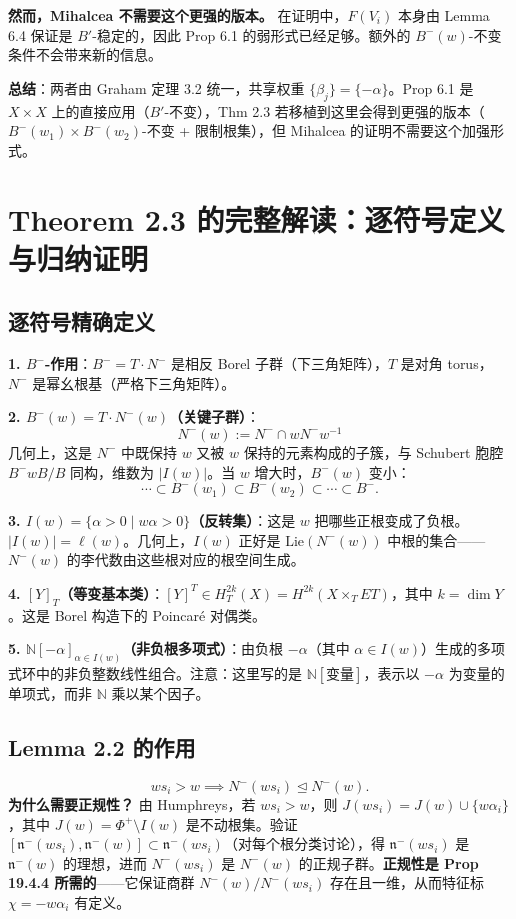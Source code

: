 \textbf{然而，Mihalcea 不需要这个更强的版本。} 在证明中，$F(V_i)$ 本身由 Lemma 6.4 保证是 $B'$-稳定的，因此 Prop 6.1 的弱形式已经足够。额外的 $B^-(w)$-不变条件不会带来新的信息。

\textbf{总结}：两者由 Graham 定理 3.2 统一，共享权重 $\{\beta_j\} = \{-\alpha\}$。Prop 6.1 是 $X \times X$ 上的直接应用（$B'$-不变），Thm 2.3 若移植到这里会得到更强的版本（$B^-(w_1)\times B^-(w_2)$-不变 + 限制根集），但 Mihalcea 的证明不需要这个加强形式。

\section{Theorem 2.3 的完整解读：逐符号定义与归纳证明}
\subsection{逐符号精确定义}
\textbf{1. $B^-$-作用}：$B^- = T \cdot N^-$ 是相反 Borel 子群（下三角矩阵），$T$ 是对角 torus，$N^-$ 是幂幺根基（严格下三角矩阵）。

\textbf{2. $B^-(w) = T \cdot N^-(w)$（关键子群）}：
$$N^-(w) := N^- \cap w N^- w^{-1}$$
几何上，这是 $N^-$ 中既保持 $w$ 又被 $w$ 保持的元素构成的子簇，与 Schubert 胞腔 $B^-wB/B$ 同构，维数为 $|I(w)|$。当 $w$ 增大时，$B^-(w)$ 变小：
$$\cdots \subset B^-(w_1) \subset B^-(w_2) \subset \cdots \subset B^-.$$

\textbf{3. $I(w) = \{\alpha > 0 \mid w\alpha > 0\}$（反转集）}：这是 $w$ 把哪些正根变成了负根。$|I(w)| = \ell(w)$。几何上，$I(w)$ 正好是 $\mathrm{Lie}(N^-(w))$ 中根的集合——$N^-(w)$ 的李代数由这些根对应的根空间生成。

\textbf{4. $[Y]_T$（等变基本类）}：$[Y]^T \in H_T^{2k}(X) = H^{2k}(X \times_T ET)$，其中 $k = \dim Y$。这是 Borel 构造下的 Poincaré 对偶类。

\textbf{5. $\mathbb{N}[-\alpha]_{\alpha \in I(w)}$（非负根多项式）}：由负根 $-\alpha$（其中 $\alpha \in I(w)$）生成的多项式环中的非负整数线性组合。注意：这里写的是 $\mathbb{N}[\text{变量}]$，表示以 $-\alpha$ 为变量的单项式，而非 $\mathbb{N}$ 乘以某个因子。

\subsection{Lemma 2.2 的作用}
$$ws_i > w \implies N^-(ws_i) \trianglelefteq N^-(w).$$
\textbf{为什么需要正规性？} 由 Humphreys，若 $ws_i > w$，则 $J(ws_i) = J(w) \cup \{w\alpha_i\}$，其中 $J(w) = \Phi^+ \setminus I(w)$ 是不动根集。验证 $[\mathfrak{n}^-(ws_i), \mathfrak{n}^-(w)] \subset \mathfrak{n}^-(ws_i)$（对每个根分类讨论），得 $\mathfrak{n}^-(ws_i)$ 是 $\mathfrak{n}^-(w)$ 的理想，进而 $N^-(ws_i)$ 是 $N^-(w)$ 的正规子群。\textbf{正规性是 Prop 19.4.4 所需的}——它保证商群 $N^-(w)/N^-(ws_i)$ 存在且一维，从而特征标 $\chi = -w\alpha_i$ 有定义。

